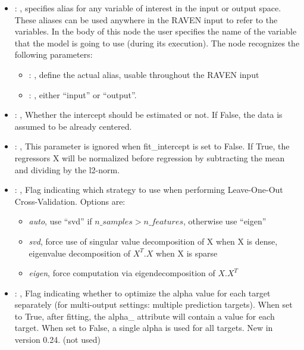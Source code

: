 \begin{itemize}
    \item {}: , 
      specifies alias for         any variable of interest in the input or output space. These
      aliases can be used anywhere in the RAVEN input to         refer to the variables. In the body
      of this node the user specifies the name of the variable that the model is going to use
      (during its execution).
      The  node recognizes the following parameters:
        \begin{itemize}
          \item {}: , 
            define the actual alias, usable throughout the RAVEN input
          \item {}: , 
            either ``input'' or ``output''.
      \end{itemize}

    \item {}: , 
      Whether the intercept should be estimated or not. If False,
      the data is assumed to be already centered.

    \item {}: , 
      This parameter is ignored when fit\_intercept is set to False. If True, the
      regressors X will be normalized before regression by subtracting the mean and dividing
      by the l2-norm.

    \item {}: , 
      Flag indicating which strategy to use when performing Leave-One-Out Cross-Validation.
      Options are:                                                  \begin{itemize}
      \item \textit{auto}, use ``svd'' if $n\_samples > n\_features$, otherwise use ``eigen''
      \item \textit{svd}, force use of singular value decomposition of X when X is
      dense, eigenvalue decomposition of $X^T.X$ when X is sparse
      \item \textit{eigen}, force computation via eigendecomposition of $X.X^T$
      \end{itemize}

    \item {}: , 
      Flag indicating whether to optimize the alpha value for each target separately
      (for multi-output settings: multiple prediction targets). When set to True, after fitting,
      the alpha\_ attribute will contain a value for each target. When set to False, a single alpha
      is used for all targets. New in version 0.24. (not used)


\end{itemize}
